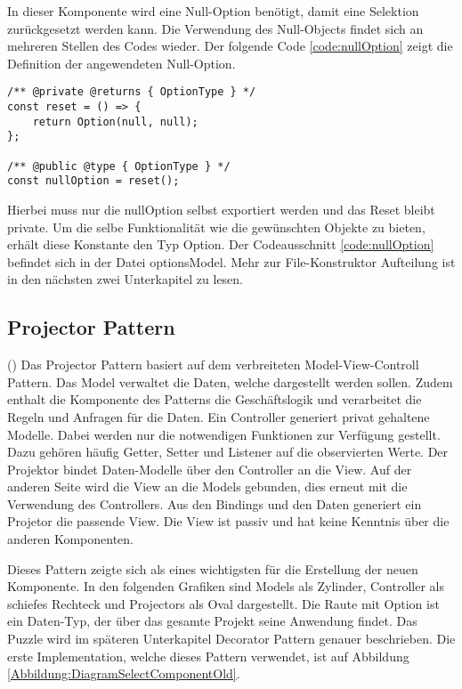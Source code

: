 In dieser Komponente wird eine Null-Option benötigt, damit eine Selektion zurückgesetzt werden kann.
Die Verwendung des Null-Objects findet sich an mehreren Stellen des Codes wieder.
Der folgende Code \ref{code:nullOption} zeigt die Definition der angewendeten Null-Option.

\begin{lstlisting}[style = htmlcssjs, caption = Null-Option, label = code:nullOption]
/** @private @returns { OptionType } */
const reset = () => {
    return Option(null, null);
};

/** @public @type { OptionType } */
const nullOption = reset();
\end{lstlisting}

Hierbei muss nur die nullOption selbst exportiert werden und das Reset bleibt private.
Um die selbe Funktionalität wie die gewünschten Objekte zu bieten, erhält diese Konstante den Typ Option.
Der Codeausschnitt \ref{code:nullOption} befindet sich in der Datei optionsModel.
Mehr zur File-Konstruktor Aufteilung ist in den nächsten zwei Unterkapitel zu lesen.

\subsection{Projector Pattern}

(\cite{projectorPattern}) Das Projector Pattern basiert auf dem verbreiteten Model-View-Controll Pattern.
Das Model verwaltet die Daten, welche dargestellt werden sollen.
Zudem enthalt die Komponente des Patterns die Geschäftslogik und verarbeitet die Regeln und Anfragen für die Daten.
Ein Controller generiert privat gehaltene Modelle.
Dabei werden nur die notwendigen Funktionen zur Verfügung gestellt.
Dazu gehören häufig Getter, Setter und Listener auf die observierten Werte.
Der Projektor bindet Daten-Modelle über den Controller an die View.
Auf der anderen Seite wird die View an die Models gebunden, dies erneut mit die Verwendung des Controllers.
Aus den Bindings und den Daten generiert ein Projetor die passende View.
Die View ist passiv und hat keine Kenntnis über die anderen Komponenten.

Dieses Pattern zeigte sich als eines wichtigsten für die Erstellung der neuen Komponente.
In den folgenden Grafiken sind Models als Zylinder, Controller als schiefes Rechteck und Projectors als Oval dargestellt.
Die Raute mit Option ist ein Daten-Typ, der über das gesamte Projekt seine Anwendung findet.
Das Puzzle wird im späteren Unterkapitel Decorator Pattern genauer beschrieben.
Die erste Implementation, welche dieses Pattern verwendet, ist auf Abbildung \ref{Abbildung:DiagramSelectComponentOld}.

